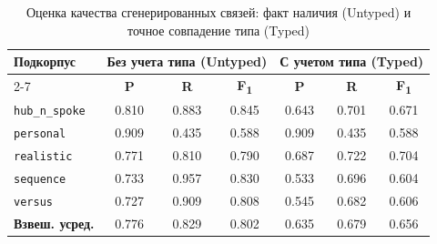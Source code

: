 \begin{table}[H]
    \caption{Оценка качества сгенерированных связей: факт наличия (Untyped) и точное совпадение типа (Typed)}
    \label{tab:generated_links_eval}
    \centering
    \begin{tabular}{lcccccc}
        \hline
        \multirow{2}{*}{\textbf{Подкорпус}} & \multicolumn{3}{c}{\textbf{Без учета типа (Untyped)}} & \multicolumn{3}{c}{\textbf{С учетом типа (Typed)}}                                                                                       \\
        \cline{2-7}
                                            & \textbf{P}                                            & \textbf{R}                                         & \textbf{F\textsubscript{1}} & \textbf{P} & \textbf{R} & \textbf{F\textsubscript{1}} \\
        \hline
        \texttt{hub\_n\_spoke}              & 0.810                                                 & 0.883                                              & 0.845                       & 0.643      & 0.701      & 0.671                       \\
        \texttt{personal}                   & 0.909                                                 & 0.435                                              & 0.588                       & 0.909      & 0.435      & 0.588                       \\
        \texttt{realistic}                  & 0.771                                                 & 0.810                                              & 0.790                       & 0.687      & 0.722      & 0.704                       \\
        \texttt{sequence}                   & 0.733                                                 & 0.957                                              & 0.830                       & 0.533      & 0.696      & 0.604                       \\
        \texttt{versus}                     & 0.727                                                 & 0.909                                              & 0.808                       & 0.545      & 0.682      & 0.606                       \\
        \hline
        \textbf{Взвеш. усред.}              & 0.776                                                 & 0.829                                              & 0.802                       & 0.635      & 0.679      & 0.656                       \\
        \hline
    \end{tabular}
\end{table}

